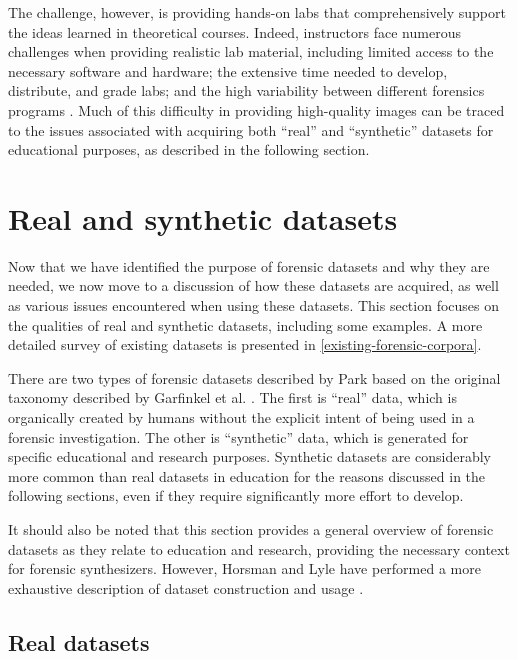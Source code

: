 \documentclass[letterpaper,12pt]{report}
\begin{document}
The challenge, however, is providing hands-on labs that comprehensively
support the ideas learned in theoretical courses. Indeed, instructors
face numerous challenges when providing realistic lab material,
including limited access to the necessary software and hardware; the
extensive time needed to develop, distribute, and grade labs; and the
high variability between different forensics programs
\cite{adelsteinAutomaticallyCreatingRealistic2005,guptaDigitalForensicsLab2022,lawrenceFrameworkDesignWebbased2009}.
Much of this difficulty in providing high-quality images can be traced
to the issues associated with acquiring both ``real'' and ``synthetic''
datasets for educational purposes, as described in the following
section.

\section{Real and synthetic
datasets}\label{real-and-synthetic-datasets}

Now that we have identified the purpose of forensic datasets and why
they are needed, we now move to a discussion of how these datasets are
acquired, as well as various issues encountered when using these
datasets. This section focuses on the qualities of real and synthetic
datasets, including some examples. A more detailed survey of existing
datasets is presented in \autoref{existing-forensic-corpora}.

There are two types of forensic datasets described by Park
\cite{parkTREDEVMPOPCultivating2018} based on the original taxonomy
described by Garfinkel et al.
\cite{garfinkelBringingScienceDigital2009}. The first is ``real''
data, which is organically created by humans without the explicit intent
of being used in a forensic investigation. The other is ``synthetic''
data, which is generated for specific educational and research purposes.
Synthetic datasets are considerably more common than real datasets in
education for the reasons discussed in the following sections, even if
they require significantly more effort to develop.

It should also be noted that this section provides a general overview of
forensic datasets as they relate to education and research, providing
the necessary context for forensic synthesizers. However, Horsman and
Lyle have performed a more exhaustive description of dataset
construction and usage
\cite{horsmanDatasetConstructionChallenges2021}.

\subsection{Real datasets}\label{real-datasets}
\end{document}
